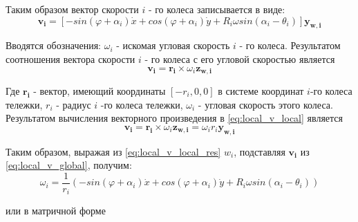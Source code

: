 \documentclass[oneside,final,14pt]{extreport}
\newcommand{\bs}{\boldsymbol}
\begin{document}
Таким образом вектор скорости $i$ - го колеса записывается в виде:
\begin{equation}
\label{eq:local_v_global}
\bs{v_{i}}
=
[
-sin(\varphi +\alpha_{i})\dot{x}
+cos(\varphi +\alpha_{i})\dot{y}
+
R_{i}
\omega
sin(\alpha_{i} - \theta_{i})
]
\bs{y_{w,i}}
\end{equation}



Вводятся обозначения: $\omega_{i}$ - искомая угловая скорость $i$ - го колеса.
Результатом соотношения вектора скорости $i$ - го колеса с его угловой скоростью является
\begin{equation}
\label{eq:local_v_local}
\bs{v_{i}}
=
\bs{r_{i}}
\times
\omega_{i}
\bs{z_{w,i}}
\end{equation}

Где $\bs{r_{i}}$  - вектор, имеющий координаты $[-r_{i},0,0]$ в системе координат $i$-го колеса тележки, $r_{i}$ - радиус $i$ -го колеса тележки, $\omega_{i}$ - угловая скорость этого колеса.
Результатом вычисления векторного произведения в \ref{eq:local_v_local} является 
\begin{equation}
\label{eq:local_v_local_res}
\bs{v_{i}}
=
\bs{r_{i}}
\times
\omega_{i}
\bs{z_{w,i}}
=
\omega_{i}
r_{i}
\bs{y_{w,i}}
\end{equation}

Таким образом, выражая из \ref{eq:local_v_local_res} $w_{i}$, подставляя $\bs{v_{i}}$ из \ref{eq:local_v_global}, получим:
\begin{equation}
\omega_{i}
=
\frac{1}{r_{i}}
(
-sin(\varphi +\alpha_{i})\dot{x}
+cos(\varphi +\alpha_{i})\dot{y}
+
R_{i}
\omega
sin(\alpha_{i} - \theta_{i})
)
\end{equation}

или в матричной форме 
\end{document}
